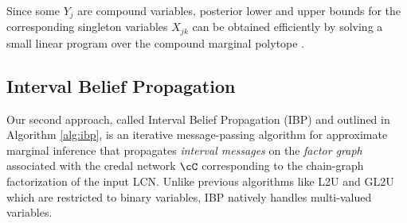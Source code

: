 \documentclass{article}
\begin{document}
Since some $Y_j$ are compound variables, posterior lower and upper bounds for the corresponding singleton variables $X_{jk}$ can be obtained efficiently by solving a small linear program over the compound marginal polytope \cite{cozman2000credal,maua2020ijar}.

\subsection{Interval Belief Propagation}
\label{sec-ibp}



Our second approach, called Interval Belief Propagation (IBP) and outlined in Algorithm \ref{alg:ibp}, is an iterative message-passing algorithm for approximate marginal inference that propagates \emph{interval messages} on the \emph{factor graph} associated with the credal network $\cC$ corresponding to the chain-graph factorization of the input LCN. Unlike previous algorithms like L2U \cite{l2u} and GL2U \cite{antonucci2010} which are restricted to binary variables, IBP natively handles multi-valued variables.
\end{document}
